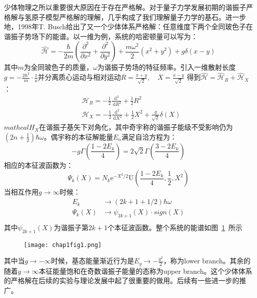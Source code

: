 少体物理之所以重要很大原因在于存在严格解。对于量子力学发展初期的谐振子严格解与氢原子模型严格解的理解，几乎构成了我们理解量子力学的基石。进一步地，1998年T. Busch给出了又一个少体体系严格解：任意维度下两个全同玻色子在谐振子势场下的能谱。以一维为例，系统的哈密顿量可以写为：
\begin{equation}
\hat{\mathcal{H}}=-\frac{\hbar}{2 m}\left(\frac{\partial^{2}}{\partial x^{2}}+\frac{\partial^{2}}{\partial y^{2}}\right)+\frac{m \omega^{2}}{2}\left(x^{2}+y^{2}\right)+g \delta(x-y)
\end{equation}
其中$m$为全同玻色子的质量，$\omega$为谐振子势场的特征频率。引入一维散射长度$g= -\frac{2\hbar^2}{m}\cdot\frac{1}{a}$并分离质心运动与相对运动$R = \frac{x+y}{\sqrt{2}}, \quad X = \frac{x-y}{\sqrt{2}}$
得到$\hat{\mathcal{H} } = \hat{\mathcal{H}}_R+ \hat{\mathcal{H}}_X$：
\begin{equation}
\begin{aligned}
&\mathcal{H}_{R}=-\frac{1}{2} \frac{\mathrm{d}^{2}}{\mathrm{~d} R^{2}}+\frac{1}{2} R^{2} \\
&\mathcal{H}_{X}=-\frac{1}{2} \frac{\mathrm{d}^{2}}{\mathrm{~d} X^{2}}+\frac{1}{2} X^{2}+\frac{g}{\sqrt{2}} \delta(X)
\end{aligned}
\end{equation}
$mathcal{H}_{X}$在谐振子基矢下对角化，其中奇宇称的谐振子能级不受影响仍为$(2n+\frac{1}{2})\hbar\omega$。偶宇称的本征解能量$E_n$满足自洽方程为：
\begin{equation}
	-g \Gamma\left(\frac{1-2 E_{k}}{4}\right)=2 \sqrt{2} \Gamma\left(\frac{3-2 E_{k}}{4}\right)
\end{equation}
相应的本征波函数为：
\begin{equation}
	\Psi_{k}(X)=N_{k} \mathrm{e}^{-X^{2} / 2} \mathrm{U}\left(\frac{1-2 E_{k}}{4}, \frac{1}{2}, X^{2}\right)
\end{equation}
当相互作用$g\to\infty$时候：
\begin{equation}
\begin{split}
	E_k &\to (2k+1+1/2)\hbar\omega\\
	\Psi_{k}(X) &\to \psi_{2k+1}(X)\cdot sign(X)\\
\end{split}
\end{equation}
其中$\psi_{2k+1}(X)$为谐振子第$2k+1$个本征波函数。整个系统的能谱如图~\ref{chap1fig1}~所示
\begin{figure}[!htbp]
    \centering
    \texttt{[image: chap1fig1.png]}
    \label{chap1fig1}
\end{figure}
其中当$g\to-\infty$时候，基态能量渐近行为是$E_g\to-\frac{g^2}{2}$，称为lower branch。其余的随着$g\to\infty$本征能量饱和在奇数谐振子能量的态称为upper branch。这个少体体系的严格解在后续的实验与理论发展中起了很重要的做用。{\color{red}后续有一些进一步的推广。}



